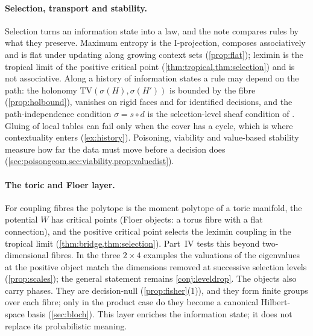 \documentclass[11pt]{article}
\theoremstyle{definition}\newtheorem{definition}[theorem]{Definition}\newtheorem{remark}[theorem]{Remark}\newtheorem{example}[theorem]{Example}\newtheorem{problem}[theorem]{Open problem}\crefname{problem}{Problem}{Problems}
\begin{document}
\paragraph{Selection, transport and stability.} Selection turns an information state into a law, and the note compares rules by what they preserve. Maximum entropy is the I-projection, composes associatively and is flat under updating along growing context sets (\cref{prop:flat}); leximin is the tropical limit of the positive critical point (\cref{thm:tropical,thm:selection}) and is not associative. Along a history of information states a rule may depend on the path: the holonomy $\mathrm{TV}(\sigma(H),\sigma(H'))$ is bounded by the fibre (\cref{prop:holbound}), vanishes on rigid faces and for identified decisions, and the path-independence condition $\sigma=s\circ d$ is the selection-level sheaf condition of \cite{TohmeCaterinaGangle2017}. Gluing of local tables can fail only when the cover has a cycle, which is where contextuality enters (\cref{ex:history}). Poisoning, viability and value-based stability measure how far the data must move before a decision does (\cref{sec:poisongeom,sec:viability,prop:valuedist}).

\paragraph{The toric and Floer layer.} For coupling fibres the polytope is the moment polytope of a toric manifold, the potential $W$ has critical points (Floer objects: a torus fibre with a flat connection), and the positive critical point selects the leximin coupling in the tropical limit (\cref{thm:bridge,thm:selection}). Part~IV tests this beyond two-dimensional fibres. In the three $2\times4$ examples the valuations of the eigenvalues at the positive object match the dimensions removed at successive selection levels (\cref{prop:scales}); the general statement remains \cref{conj:leveldrop}. The objects also carry phases. They are decision-null (\cref{prop:fisher}(1)), and they form finite groups over each fibre; only in the product case do they become a canonical Hilbert-space basis (\cref{sec:bloch}). This layer enriches the information state; it does not replace its probabilistic meaning.
\end{document}
